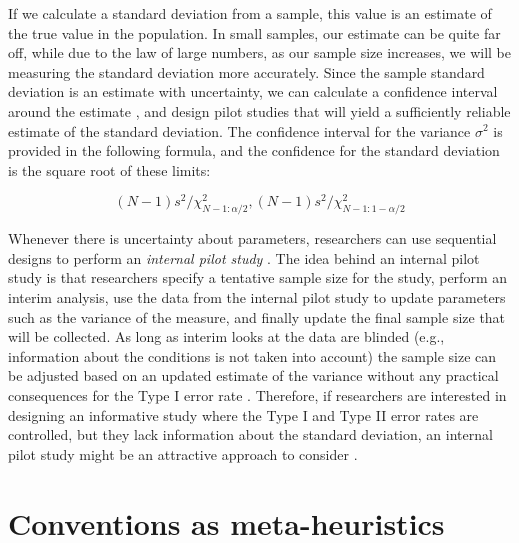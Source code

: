 \documentclass[
  oneside]{book}
\begin{document}
If we calculate a standard deviation from a sample, this value is an estimate of the true value in the population. In small samples, our estimate can be quite far off, while due to the law of large numbers, as our sample size increases, we will be measuring the standard deviation more accurately. Since the sample standard deviation is an estimate with uncertainty, we can calculate a confidence interval around the estimate \citep{smithson_confidence_2003}, and design pilot studies that will yield a sufficiently reliable estimate of the standard deviation. The confidence interval for the variance \(\sigma^2\) is provided in the following formula, and the confidence for the standard deviation is the square root of these limits:

\[(N - 1)s^2/\chi^2_{N-1:\alpha/2},(N - 1)s^2/\chi^2_{N-1:1-\alpha/2}\]

Whenever there is uncertainty about parameters, researchers can use sequential designs to perform an \emph{internal pilot study} \citep{wittes_role_1990}. The idea behind an internal pilot study is that researchers specify a tentative sample size for the study, perform an interim analysis, use the data from the internal pilot study to update parameters such as the variance of the measure, and finally update the final sample size that will be collected. As long as interim looks at the data are blinded (e.g., information about the conditions is not taken into account) the sample size can be adjusted based on an updated estimate of the variance without any practical consequences for the Type I error rate \citep{friede_sample_2006, proschan_two-stage_2005}. Therefore, if researchers are interested in designing an informative study where the Type I and Type II error rates are controlled, but they lack information about the standard deviation, an internal pilot study might be an attractive approach to consider \citep{chang_adaptive_2016}.

\hypertarget{conventions-as-meta-heuristics}{%
\section{Conventions as meta-heuristics}\label{conventions-as-meta-heuristics}}
\end{document}

